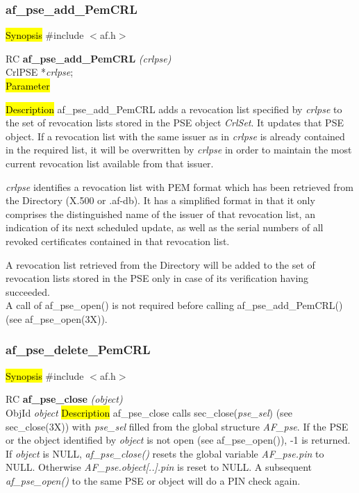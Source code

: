 \subsubsection{af\_pse\_add\_PemCRL}
\label{af_add_PemCRL}
\hl{Synopsis}
\#include $<$af.h$>$ 

RC {\bf af\_pse\_add\_PemCRL} {\em (crlpse)} \\
CrlPSE *{\em crlpse}; \\
\hl{Parameter}

\hl{Description}
af\_pse\_add\_PemCRL adds a revocation list specified by {\em crlpse} to the set
of revocation lists stored in the PSE object {\em CrlSet}. It updates that PSE object. 
If a revocation list with the same issuer as in {\em crlpse} is already contained 
in the required list, it will be overwritten by {\em crlpse} in order to maintain
the most current revocation list available from that issuer.

{\em crlpse} identifies a revocation list with PEM format which has been retrieved from
the Directory (X.500 or .af-db). It has a simplified format in that it only comprises the distinguished
name of the issuer of that revocation list, an indication of its next scheduled update,
as well as the serial numbers of all revoked certificates contained in that revocation list.
 
A revocation list retrieved from the Directory will be added to the set of revocation lists
stored in the PSE only in case of its verification having succeeded. 
\\ [1em]
A call of af\_pse\_open() is not required before calling af\_pse\_add\_PemCRL()
(see af\_pse\_open(3X)).


\subsubsection{af\_pse\_delete\_PemCRL}
\label{af_sc_close}
\hl{Synopsis}
\#include $<$af.h$>$ 

RC {\bf af\_pse\_close} {\em (object)} \\
ObjId {\em *object}
\hl{Description}
af\_pse\_close calls sec\_close({\em pse\_sel}) (see sec\_close(3X)) 
with {\em pse\_sel} filled from the global structure {\em AF\_pse}. If the PSE
or the object identified by {\em object} is not open (see af\_pse\_open()), -1 is returned.
If {\em object} is NULL, {\em af\_pse\_close()} resets the global variable {\em AF\_pse.pin} to NULL.
Otherwise {\em AF\_pse.object[..].pin} is reset to NULL. A subsequent {\em af\_pse\_open()}
to the same PSE or object will do a PIN check again.


